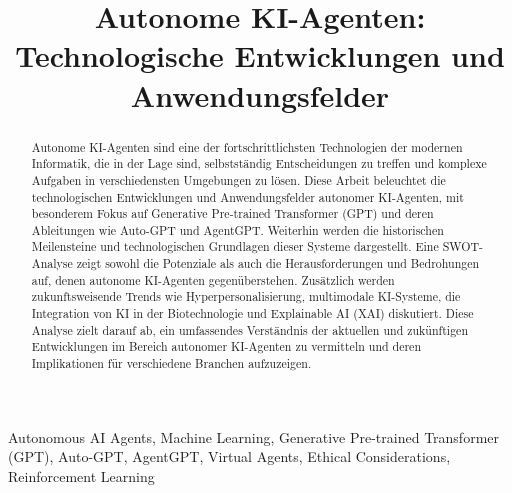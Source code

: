 \documentclass[conference]{IEEEtran}
\begin{document}
\title{Autonome KI-Agenten: Technologische Entwicklungen und Anwendungsfelder}

\author{
\and
{}
}

\maketitle

\begin{abstract}
Autonome KI-Agenten sind eine der fortschrittlichsten Technologien der modernen Informatik, die in der Lage sind, selbstständig Entscheidungen zu treffen und komplexe Aufgaben in verschiedensten Umgebungen zu lösen. Diese Arbeit beleuchtet die technologischen Entwicklungen und Anwendungsfelder autonomer KI-Agenten, mit besonderem Fokus auf Generative Pre-trained Transformer (GPT) und deren Ableitungen wie Auto-GPT und AgentGPT. Weiterhin werden die historischen Meilensteine und technologischen Grundlagen dieser Systeme dargestellt. Eine SWOT-Analyse zeigt sowohl die Potenziale als auch die Herausforderungen und Bedrohungen auf, denen autonome KI-Agenten gegenüberstehen. Zusätzlich werden zukunftsweisende Trends wie Hyperpersonalisierung, multimodale KI-Systeme, die Integration von KI in der Biotechnologie und Explainable AI (XAI) diskutiert. Diese Analyse zielt darauf ab, ein umfassendes Verständnis der aktuellen und zukünftigen Entwicklungen im Bereich autonomer KI-Agenten zu vermitteln und deren Implikationen für verschiedene Branchen aufzuzeigen.
\end{abstract}

\begin{IEEEkeywords}
Autonomous AI Agents, Machine Learning, Generative Pre-trained Transformer (GPT), Auto-GPT, AgentGPT, Virtual Agents, Ethical Considerations, Reinforcement Learning
\end{IEEEkeywords}
\end{document}
